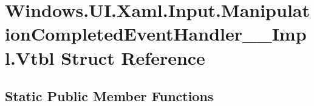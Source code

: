 \hypertarget{struct_windows_1_1_u_i_1_1_xaml_1_1_input_1_1_manipulation_completed_event_handler_____impl_1_1_vtbl}{}\section{Windows.\+U\+I.\+Xaml.\+Input.\+Manipulation\+Completed\+Event\+Handler\+\_\+\+\_\+\+Impl.\+Vtbl Struct Reference}
\label{struct_windows_1_1_u_i_1_1_xaml_1_1_input_1_1_manipulation_completed_event_handler_____impl_1_1_vtbl}
\subsection*{Static Public Member Functions}
